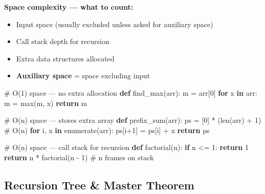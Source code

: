 \documentclass[11pt]{article}
\providecommand{\tightlist}{\setlength{\itemsep}{1pt}\setlength{\parskip}{0pt}}
\newenvironment{Shaded}{\begin{snugshade}}{\end{snugshade}}
\newcommand{\BuiltInTok}[1]{\textcolor[rgb]{0.50,0.55,0.55}{#1}}
\newcommand{\CommentTok}[1]{\textcolor[rgb]{0.48,0.49,0.49}{#1}}
\newcommand{\ControlFlowTok}[1]{\textcolor[rgb]{0.99,0.74,0.29}{\textbf{#1}}}
\newcommand{\DecValTok}[1]{\textcolor[rgb]{0.96,0.45,0.00}{#1}}
\newcommand{\KeywordTok}[1]{\textcolor[rgb]{0.81,0.81,0.76}{\textbf{#1}}}
\newcommand{\NormalTok}[1]{\textcolor[rgb]{0.81,0.81,0.76}{#1}}
\newcommand{\OperatorTok}[1]{\textcolor[rgb]{0.81,0.81,0.76}{#1}}
\begin{document}
\textbf{Space complexity --- what to count:}

\begin{itemize}
\tightlist
\item
  Input space (usually excluded unless asked for auxiliary space)
\item
  Call stack depth for recursion
\item
  Extra data structures allocated
\item
  \textbf{Auxiliary space} = space excluding input
\end{itemize}


\begin{Shaded}
\begin{Highlighting}[]
\CommentTok{\# O(1) space — no extra allocation}
\KeywordTok{def}\NormalTok{ find\_max(arr):}
\NormalTok{    m }\OperatorTok{=}\NormalTok{ arr[}\DecValTok{0}\NormalTok{]}
    \ControlFlowTok{for}\NormalTok{ x }\KeywordTok{in}\NormalTok{ arr:}
\NormalTok{        m }\OperatorTok{=} \BuiltInTok{max}\NormalTok{(m, x)}
    \ControlFlowTok{return}\NormalTok{ m}

\CommentTok{\# O(n) space — stores extra array}
\KeywordTok{def}\NormalTok{ prefix\_sum(arr):}
\NormalTok{    ps }\OperatorTok{=}\NormalTok{ [}\DecValTok{0}\NormalTok{] }\OperatorTok{*}\NormalTok{ (}\BuiltInTok{len}\NormalTok{(arr) }\OperatorTok{+} \DecValTok{1}\NormalTok{)  }\CommentTok{\# O(n)}
    \ControlFlowTok{for}\NormalTok{ i, x }\KeywordTok{in} \BuiltInTok{enumerate}\NormalTok{(arr):}
\NormalTok{        ps[i}\OperatorTok{+}\DecValTok{1}\NormalTok{] }\OperatorTok{=}\NormalTok{ ps[i] }\OperatorTok{+}\NormalTok{ x}
    \ControlFlowTok{return}\NormalTok{ ps}

\CommentTok{\# O(n) space — call stack for recursion}
\KeywordTok{def}\NormalTok{ factorial(n):}
    \ControlFlowTok{if}\NormalTok{ n }\OperatorTok{\textless{}=} \DecValTok{1}\NormalTok{: }\ControlFlowTok{return} \DecValTok{1}
    \ControlFlowTok{return}\NormalTok{ n }\OperatorTok{*}\NormalTok{ factorial(n }\OperatorTok{{-}} \DecValTok{1}\NormalTok{)  }\CommentTok{\# n frames on stack}
\end{Highlighting}
\end{Shaded}

\subsection{Recursion Tree \& Master Theorem}\label{recursion-tree--master-theorem}
\end{document}
